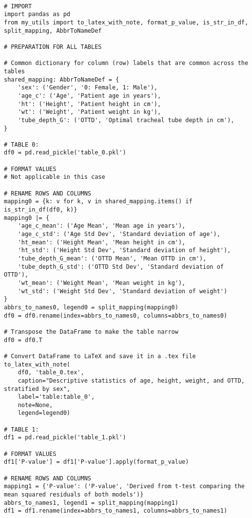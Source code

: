 \documentclass[11pt]{article}
\begin{document}
\begin{verbatim}

# IMPORT
import pandas as pd
from my_utils import to_latex_with_note, format_p_value, is_str_in_df, split_mapping, AbbrToNameDef

# PREPARATION FOR ALL TABLES

# Common dictionary for column (row) labels that are common across the tables
shared_mapping: AbbrToNameDef = {
    'sex': ('Gender', '0: Female, 1: Male'),
    'age_c': ('Age', 'Patient age in years'),
    'ht': ('Height', 'Patient height in cm'),
    'wt': ('Weight', 'Patient weight in kg'),
    'tube_depth_G': ('OTTD', 'Optimal tracheal tube depth in cm'),
}

# TABLE 0:
df0 = pd.read_pickle('table_0.pkl')

# FORMAT VALUES 
# Not applicable in this case

# RENAME ROWS AND COLUMNS 
mapping0 = {k: v for k, v in shared_mapping.items() if is_str_in_df(df0, k)} 
mapping0 |= {
    'age_c_mean': ('Age Mean', 'Mean age in years'),
    'age_c_std': ('Age Std Dev', 'Standard deviation of age'),
    'ht_mean': ('Height Mean', 'Mean height in cm'),
    'ht_std': ('Height Std Dev', 'Standard deviation of height'),
    'tube_depth_G_mean': ('OTTD Mean', 'Mean OTTD in cm'),
    'tube_depth_G_std': ('OTTD Std Dev', 'Standard deviation of OTTD'),
    'wt_mean': ('Weight Mean', 'Mean weight in kg'),
    'wt_std': ('Weight Std Dev', 'Standard deviation of weight')
}
abbrs_to_names0, legend0 = split_mapping(mapping0)
df0 = df0.rename(index=abbrs_to_names0, columns=abbrs_to_names0)

# Transpose the DataFrame to make the table narrow
df0 = df0.T

# Convert DataFrame to LaTeX and save it in a .tex file
to_latex_with_note(
    df0, 'table_0.tex',
    caption="Descriptive statistics of age, height, weight, and OTTD, stratified by sex", 
    label='table:table_0',
    note=None,
    legend=legend0)

# TABLE 1:
df1 = pd.read_pickle('table_1.pkl')

# FORMAT VALUES 
df1['P-value'] = df1['P-value'].apply(format_p_value)

# RENAME ROWS AND COLUMNS 
mapping1 = {'P-value': ('P-value', 'Derived from t-test comparing the mean squared residuals of both models')}
abbrs_to_names1, legend1 = split_mapping(mapping1)
df1 = df1.rename(index=abbrs_to_names1, columns=abbrs_to_names1)


\end{verbatim}
\end{document}
